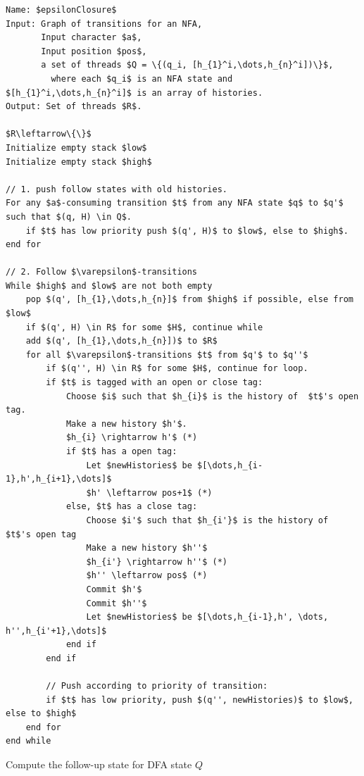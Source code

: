 \documentclass[english]{sigplanconf}
\theoremstyle{definition}
\begin{document}
\begin{algorithm*}[tb]
\begin{lstlisting}[mathescape,tabsize=2]
Name: $epsilonClosure$
Input: Graph of transitions for an NFA,
	   Input character $a$,
	   Input position $pos$,
	   a set of threads $Q = \{(q_i, [h_{1}^i,\dots,h_{n}^i])\}$,
	     where each $q_i$ is an NFA state and $[h_{1}^i,\dots,h_{n}^i]$ is an array of histories.
Output: Set of threads $R$.

$R\leftarrow\{\}$
Initialize empty stack $low$
Initialize empty stack $high$

// 1. push follow states with old histories.
For any $a$-consuming transition $t$ from any NFA state $q$ to $q'$ such that $(q, H) \in Q$.
	if $t$ has low priority push $(q', H)$ to $low$, else to $high$.
end for

// 2. Follow $\varepsilon$-transitions
While $high$ and $low$ are not both empty
	pop $(q', [h_{1},\dots,h_{n}]$ from $high$ if possible, else from $low$
	if $(q', H) \in R$ for some $H$, continue while
	add $(q', [h_{1},\dots,h_{n}])$ to $R$
	for all $\varepsilon$-transitions $t$ from $q'$ to $q''$
		if $(q'', H) \in R$ for some $H$, continue for loop.
		if $t$ is tagged with an open or close tag:
			Choose $i$ such that $h_{i}$ is the history of  $t$'s open tag.
			Make a new history $h'$.
			$h_{i} \rightarrow h'$ (*)
			if $t$ has a open tag:
				Let $newHistories$ be $[\dots,h_{i-1},h',h_{i+1},\dots]$
				$h' \leftarrow pos+1$ (*)
			else, $t$ has a close tag:
				Choose $i'$ such that $h_{i'}$ is the history of  $t$'s open tag
				Make a new history $h''$
				$h_{i'} \rightarrow h''$ (*)
				$h'' \leftarrow pos$ (*)
				Commit $h'$
				Commit $h''$
				Let $newHistories$ be $[\dots,h_{i-1},h', \dots, h'',h_{i'+1},\dots]$
			end if
		end if				
				
		// Push according to priority of transition:
		if $t$ has low priority, push $(q'', newHistories)$ to $low$, else to $high$
	end for
end while
\end{lstlisting}
\label{alg:epsilonClosure}
\caption{Compute the follow-up state for DFA state $Q$}
\end{algorithm*}
\end{document}
